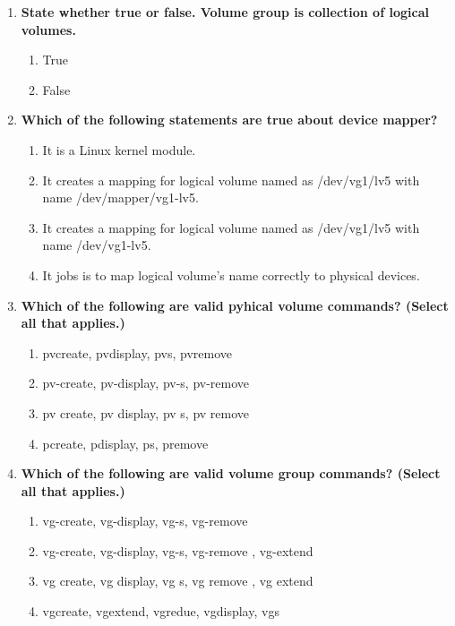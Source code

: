 \begin{flushleft}
\begin{enumerate}
		\item \textbf{State whether true or false. Volume group is collection of logical volumes.}
		\begin{enumerate}[label=(\alph*)]
			\item True 
			\item False  %
		\end{enumerate}
		\bigskip
		\bigskip
		\newpage
		\item \textbf{Which of the following statements are true about device mapper?}
		\begin{enumerate}[label=(\alph*)]
			\item It is a Linux kernel module. %
			\item It creates a mapping for logical volume named as /dev/vg1/lv5 with name /dev/mapper/vg1-lv5. %
			\item It creates a mapping for logical volume named as /dev/vg1/lv5 with name /dev/vg1-lv5. 
			\item It jobs is to map logical volume's name correctly to physical devices. %
		\end{enumerate}
		\bigskip
		\bigskip	

		\item \textbf{Which of the following are valid pyhical volume commands? (Select all that applies.)}
		\begin{enumerate}[label=(\alph*)]
			\item pvcreate, pvdisplay, pvs, pvremove %
			\item pv-create, pv-display, pv-s, pv-remove 
			\item pv create, pv display, pv s, pv remove 
			\item pcreate, pdisplay, ps, premove 
		\end{enumerate}
		\bigskip
		\bigskip
		
		
		\item \textbf{Which of the following are valid volume group commands? (Select all that applies.)}
		\begin{enumerate}[label=(\alph*)]
			\item vg-create, vg-display, vg-s, vg-remove 
			\item vg-create, vg-display, vg-s, vg-remove , vg-extend
			\item vg create, vg display, vg s, vg remove , vg extend
			\item vgcreate, vgextend, vgredue, vgdisplay, vgs %
		\end{enumerate}
		\bigskip
		\bigskip
	


\end{enumerate}
\end{flushleft}
